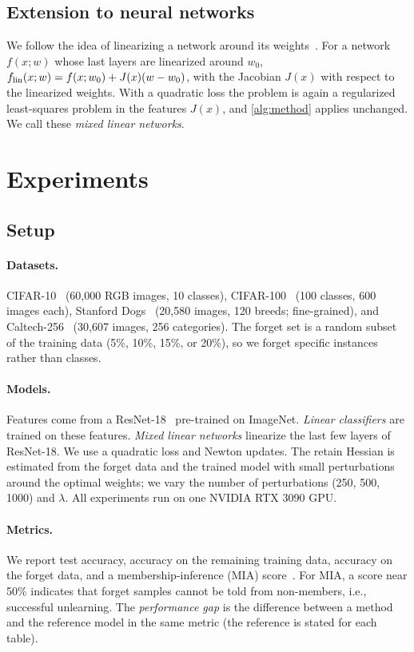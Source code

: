 \documentclass[10pt,twocolumn,letterpaper]{article}
\begin{document}
\subsection{Extension to neural networks}
We follow the idea of linearizing a network around its weights~\cite{golatkar2021mixed,jacot2018neural}. For a network $f(x;w)$ whose last layers are linearized around $w_0$,
$f_{\rm lin}(x;w)=f(x;w_0)+J(x)(w-w_0)$, with the Jacobian $J(x)$ with respect to the linearized weights. With a quadratic loss the problem is again a regularized least-squares problem in the features $J(x)$, and \cref{alg:method} applies unchanged. We call these \emph{mixed linear networks}.

\section{Experiments}
\label{sec:experiments}
\subsection{Setup}
\paragraph{Datasets.} CIFAR-10~\cite{krizhevsky2009learning} (60{,}000 RGB images, 10 classes), CIFAR-100~\cite{krizhevsky2009learning} (100 classes, 600 images each), Stanford Dogs~\cite{khosla2011novel} (20{,}580 images, 120 breeds; fine-grained), and Caltech-256~\cite{griffin2007caltech} (30{,}607 images, 256 categories). The forget set is a random subset of the training data (5\%, 10\%, 15\%, or 20\%), so we forget specific instances rather than classes.

\paragraph{Models.} Features come from a ResNet-18~\cite{he2016deep} pre-trained on ImageNet. \emph{Linear classifiers} are trained on these features. \emph{Mixed linear networks} linearize the last few layers of ResNet-18. We use a quadratic loss and Newton updates. The retain Hessian is estimated from the forget data and the trained model with small perturbations around the optimal weights; we vary the number of perturbations (250, 500, 1000) and $\lambda$. All experiments run on one NVIDIA RTX 3090 GPU.

\paragraph{Metrics.} We report test accuracy, accuracy on the remaining training data, accuracy on the forget data, and a membership-inference (MIA) score~\cite{shokri2017membership}. For MIA, a score near 50\% indicates that forget samples cannot be told from non-members, i.e., successful unlearning. The \emph{performance gap} is the difference between a method and the reference model in the same metric (the reference is stated for each table).
\end{document}
